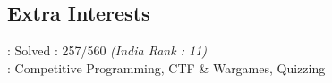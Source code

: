 \documentclass[mm]{simple_style}
\begin{document}
\begin{resume}
\sectionline

\section{Extra Interests}
: Solved : 257/560 \textit{(India Rank : 11)}\\
: Competitive Programming, CTF \& Wargames, Quizzing
\end{resume}
\end{document}
